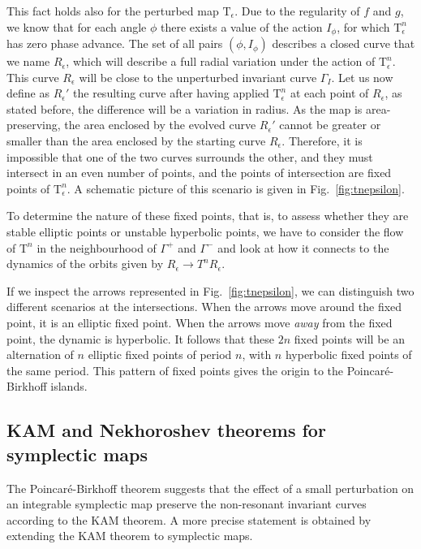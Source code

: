 This fact holds also for the perturbed map $\mathrm{T}_\epsilon$. Due to the regularity of $f$ and $g$, we know that for each angle $\phi$ there exists a value of the action $I_\phi$, for which $\mathrm{T}^n_\epsilon$ has zero phase advance. The set of all pairs $(\phi, I_\phi)$ describes a closed curve that we name $R_\epsilon$, which will describe a full radial variation under the action of $\mathrm{T}^n_\epsilon$. This curve $R_\epsilon$ will be close to the unperturbed invariant curve $\Gamma_I$. Let us now define as $R_\epsilon'$ the resulting curve after having applied $\mathrm{T}^n_\epsilon$ at each point of $R_\epsilon$, as stated before, the difference will be a variation in radius. As the map is area-preserving, the area enclosed by the evolved curve $R_\epsilon'$ cannot be greater or smaller than the area enclosed by the starting curve $R_\epsilon$. Therefore, it is impossible that one of the two curves surrounds the other, and they must intersect in an even number of points, and the points of intersection are fixed points of $\mathrm{T}^n_\epsilon$. A schematic picture of this scenario is given in Fig.~\ref{fig:tnepsilon}.

To determine the nature of these fixed points, that is, to assess whether they are stable elliptic points or unstable hyperbolic points, we have to consider the flow of $\mathrm{T}^n$ in the neighbourhood of $\Gamma^+$ and $\Gamma^-$ and look at how it connects to the dynamics of the orbits given by $R_\epsilon \to T^n R_\epsilon$.

If we inspect the arrows represented in Fig.~\ref{fig:tnepsilon}, we can distinguish two different scenarios at the intersections. When the arrows move around the fixed point, it is an elliptic fixed point. When the arrows move \textit{away} from the fixed point, the dynamic is hyperbolic. It follows that these $2n$ fixed points will be an alternation of $n$ elliptic fixed points of period $n$, with $n$ hyperbolic fixed points of the same period. This pattern of fixed points gives the origin to the Poincaré-Birkhoff islands.

\subsection{KAM and Nekhoroshev theorems for symplectic maps}

The Poincaré-Birkhoff theorem suggests that the effect of a small perturbation on an integrable symplectic map preserve the non-resonant invariant curves according to the KAM theorem. A more precise statement  is obtained by extending the KAM theorem to symplectic maps.

